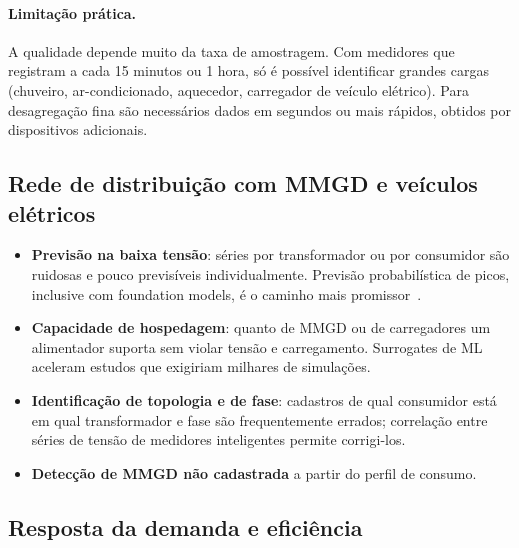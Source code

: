 \documentclass[11pt,a4paper]{article}
\begin{document}
\paragraph{Limitação prática.} A qualidade depende muito da taxa de
amostragem. Com medidores que registram a cada 15 minutos ou 1 hora, só é
possível identificar grandes cargas (chuveiro, ar-condicionado, aquecedor,
carregador de veículo elétrico). Para desagregação fina são necessários
dados em segundos ou mais rápidos, obtidos por dispositivos adicionais.

\subsection{Rede de distribuição com MMGD e veículos elétricos}

\begin{itemize}
  \item \textbf{Previsão na baixa tensão}: séries por transformador ou por
    consumidor são ruidosas e pouco previsíveis individualmente. Previsão
    probabilística de picos, inclusive com foundation models, é o caminho
    mais promissor~\cite{lvpeak}.
  \item \textbf{Capacidade de hospedagem}: quanto de MMGD ou de carregadores um
    alimentador suporta sem violar tensão e carregamento. Surrogates de ML
    aceleram estudos que exigiriam milhares de simulações.
  \item \textbf{Identificação de topologia e de fase}: cadastros de qual
    consumidor está em qual transformador e fase são frequentemente errados;
    correlação entre séries de tensão de medidores inteligentes permite
    corrigi-los.
  \item \textbf{Detecção de MMGD não cadastrada} a partir do perfil de
    consumo.
\end{itemize}

\subsection{Resposta da demanda e eficiência}
\end{document}
